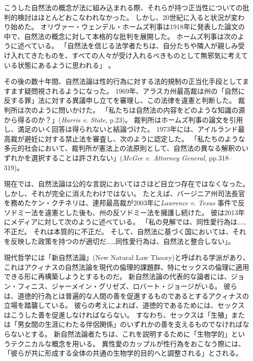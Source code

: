 \documentclass[paper=a4,book,openany]{jlreq}
\newcommand{\ig}[1]{}           %
\begin{document}
こうした自然法の概念が法に組み込まれる際、それらが持つ正当性についての批判的検討はほとんどおこなわれなかった。
しかし、20世紀に入ると状況が変わり始めた。
オリヴァー・ウェンデル・ホームズ判事は1918年に発表した論文の中で、自然法の概念に対して本格的な批判を展開した。
ホームズ判事は次のように述べている。
「自然法を信じる法学者たちは、自分たちや隣人が親しみ受け入れてきたものを、すべての人々が受け入れるべきものとして無邪気に考えている状態にあるように思われる」\citep[p.40]{holmes18:_natur_law} 。

その後の数十年間、自然法論は性的行為に対する法的規制の正当化手段としてますます疑問視されるようになった。
1969年、アラスカ州最高裁は州の「自然に反する罪」法に対する異議申し立てを審理し、この法律を違憲と判断した。
裁判所は次のように問いかけた。
「私たちは自然法の内容をどのような知識の源から得るのか？」(\emph{Harris v. State},  p.23)。
裁判所はホームズ判事の論文を引用し、満足のいく回答は得られないと結論づけた。
1973年には、アイルランド最高裁が避妊に対する禁止法を審査し、次のように認定した。
「私たちのような多元的社会において、裁判所が憲法上の法原則として、自然法の異なる解釈のいずれかを選択することは許されない」(\emph{McGee v. Attorney General}, pp.318--319)。

現在では、自然法論は公的な言説においてはさほど目立つ存在ではなくなった。
しかし、それが完全に消えたわけではない。
たとえば、バージニア州司法長官を務めたケン・クチネリは、連邦最高裁が2003年に\emph{Lawrence v. Texas} 事件で反ソドミー法を違憲とした後も、州の反ソドミー法を擁護し続けた。
彼は2013年にメディアに対して次のように述べている。
「私の見解では、同性愛行為は……不正だ。
それは本質的に不正だ。
そして、自然法に基づく国においては、それを反映した政策を持つのが適切だ……同性愛行為は、自然法と整合しない」\citep{bump13:_virgin_is_retro}。

現代哲学には「新自然法論」(New Natural Law Theory)と呼ばれる学派があり、これはアクィナスの自然法論を現代の倫理的課題群、特にセックスの倫理に適用できる形に再構築しようとするものだ。
新自然法論の代表的な論者には、ジョン・フィニス、ジャーメイン・グリゼズ、ロバート・ジョージがいる。
彼らは、道徳的行為とは普遍的な人間の善を促進するものであるとするアクィナスの立場を踏襲している。
彼らの考えによれば、道徳的であるためには、セックスはこうした善を促進しなければならない。
すなわち、セックスは「生殖」または「男女間の生涯にわたる伴侶関係」のいずれかの善を支えるものでなければならないとする。
新自然法論者たちは、これを説明するために「生物学的」というテクニカルな概念を用いる。
異性愛のカップルが性行為をおこなう際には、「彼らが共に形成する全体の共通の生物学的目的へと調整される」とされる\citep[p.25]{girgis12:_what_marriag}。
\ig{Ryan T. Anderson}
\end{document}
